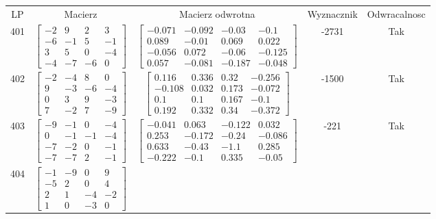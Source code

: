 \documentclass[a4paper,12pt]{article}
\begin{document}
\bgroup {} \vspace{0.2in} \begin{tabular}{c c c c c}
LP & Macierz & Macierz odwrotna & Wyznacznik & Odwracalnosc\\
401
&
$\begin{bmatrix} -2 & 9 & 2 & 3 \\ -6 & -1 & 5 & -1 \\ 3 & 5 & 0 & -4 \\ -4 & -7 & -6 & 0 \end{bmatrix}$
&
$\begin{bmatrix} -0.071 & -0.092 & -0.03 & -0.1 \\ 0.089 & -0.01 & 0.069 & 0.022 \\ -0.056 & 0.072 & -0.06 & -0.125 \\ 0.057 & -0.081 & -0.187 & -0.048 \end{bmatrix}$
&
-2731
&
Tak
\\
402
&
$\begin{bmatrix} -2 & -4 & 8 & 0 \\ 9 & -3 & -6 & -4 \\ 0 & 3 & 9 & -3 \\ 7 & -2 & 7 & -9 \end{bmatrix}$
&
$\begin{bmatrix} 0.116 & 0.336 & 0.32 & -0.256 \\ -0.108 & 0.032 & 0.173 & -0.072 \\ 0.1 & 0.1 & 0.167 & -0.1 \\ 0.192 & 0.332 & 0.34 & -0.372 \end{bmatrix}$
&
-1500
&
Tak
\\
403
&
$\begin{bmatrix} -9 & -1 & 0 & -4 \\ 0 & -1 & -1 & -4 \\ -7 & -2 & 0 & -1 \\ -7 & -7 & 2 & -1 \end{bmatrix}$
&
$\begin{bmatrix} -0.041 & 0.063 & -0.122 & 0.032 \\ 0.253 & -0.172 & -0.24 & -0.086 \\ 0.633 & -0.43 & -1.1 & 0.285 \\ -0.222 & -0.1 & 0.335 & -0.05 \end{bmatrix}$
&
-221
&
Tak
\\
404
&
$\begin{bmatrix} -1 & -9 & 0 & 9 \\ -5 & 2 & 0 & 4 \\ 2 & 1 & -4 & -2 \\ 1 & 0 & -3 & 0 \end{bmatrix}$

\end{tabular}
\end{document}
